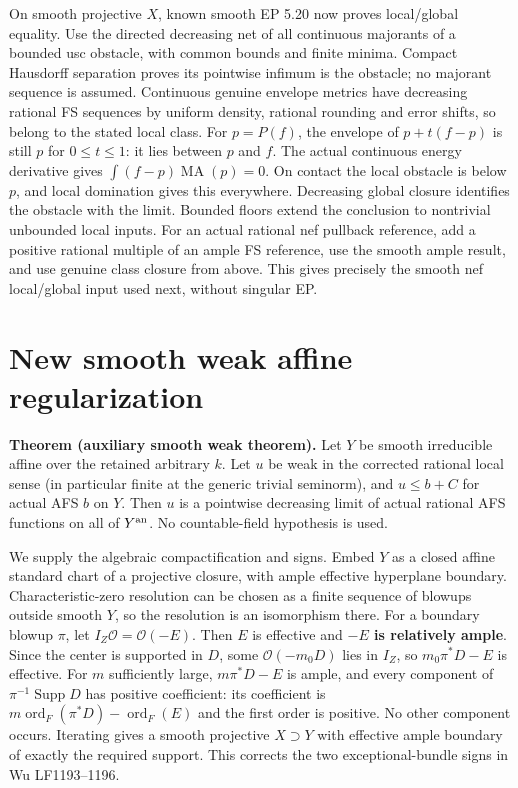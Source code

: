 \documentclass[
  10pt,
]{article}
\begin{document}
On smooth projective \(X\), known smooth EP 5.20 now proves local/global
equality. Use the directed decreasing net of all continuous majorants of
a bounded usc obstacle, with common bounds and finite minima. Compact
Hausdorff separation proves its pointwise infimum is the obstacle; no
majorant sequence is assumed. Continuous genuine envelope metrics have
decreasing rational FS sequences by uniform density, rational rounding
and error shifts, so belong to the stated local class. For \(p=P(f)\),
the envelope of \(p+t(f-p)\) is still \(p\) for \(0\le t\le1\): it lies
between \(p\) and \(f\). The actual continuous energy derivative gives
\(\int(f-p)\operatorname{MA}(p)=0\). On contact the local obstacle is
below \(p\), and local domination gives this everywhere. Decreasing
global closure identifies the obstacle with the limit. Bounded floors
extend the conclusion to nontrivial unbounded local inputs. For an
actual rational nef pullback reference, add a positive rational multiple
of an ample FS reference, use the smooth ample result, and use genuine
class closure from above. This gives precisely the smooth nef
local/global input used next, without singular EP.

\section{New smooth weak affine
regularization}\label{new-smooth-weak-affine-regularization}

\textbf{Theorem (auxiliary smooth weak theorem).} Let \(Y\) be smooth
irreducible affine over the retained arbitrary \(k\). Let \(u\) be weak
in the corrected rational local sense (in particular finite at the
generic trivial seminorm), and \(u\le b+C\) for actual AFS \(b\) on
\(Y\). Then \(u\) is a pointwise decreasing limit of actual rational AFS
functions on all of \(Y^{\rm an}\). No countable-field hypothesis is
used.

We supply the algebraic compactification and signs. Embed \(Y\) as a
closed affine standard chart of a projective closure, with ample
effective hyperplane boundary. Characteristic-zero resolution can be
chosen as a finite sequence of blowups outside smooth \(Y\), so the
resolution is an isomorphism there. For a boundary blowup \(\pi\), let
\(I_Z\mathcal O=\mathcal O(-E)\). Then \(E\) is effective and
\textbf{\(-E\) is relatively ample}. Since the center is supported in
\(D\), some \(\mathcal O(-m_0D)\) lies in \(I_Z\), so \(m_0\pi^*D-E\) is
effective. For \(m\) sufficiently large, \(m\pi^*D-E\) is ample, and
every component of \(\pi^{-1}\operatorname{Supp}D\) has positive
coefficient: its coefficient is
\(m\operatorname{ord}_F(\pi^*D)-\operatorname{ord}_F(E)\) and the first
order is positive. No other component occurs. Iterating gives a smooth
projective \(X\supset Y\) with effective ample boundary of exactly the
required support. This corrects the two exceptional-bundle signs in Wu
LF1193--1196.
\end{document}
